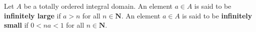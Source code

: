 Let $A$ be a totally ordered integral domain. An element $a \in A$ is said to be \textbf{infinitely large} if $a > n$ for all $n \in \mathbf{N}$. An element $a \in A$ is said to be \textbf{infinitely small} if $0 < n a < 1$ for all $n \in \mathbf{N}$.

